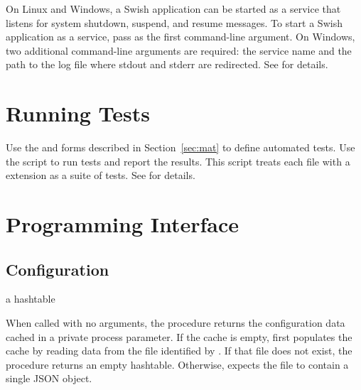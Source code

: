 On Linux and Windows, a Swish application can be started as a service
that listens for system shutdown, suspend, and resume messages.
To start a Swish application as a service, pass  as
the first command-line argument.
On Windows, two additional command-line arguments are required:
the service name and the path to the log file where stdout and
stderr are redirected.
See \hyperref[swishservice]{} for details.


\section{Running Tests}

Use the  and  forms described in
Section~\ref{sec:mat} to define automated tests.
Use the  script to run tests and report the results.
This script treats each file with a  extension as a suite of tests.
See  for details.


\section {Programming Interface}

\subsection{Configuration}

\begin{procedure}
\end{procedure}
\returns{} a hashtable

When called with no arguments, the  procedure
returns the configuration data cached in a private process parameter.
If the cache is empty,  first populates the cache by reading
data from the file identified by .
If that file does not exist, the procedure returns an empty hashtable.
Otherwise,  expects the file to contain a single JSON object.

